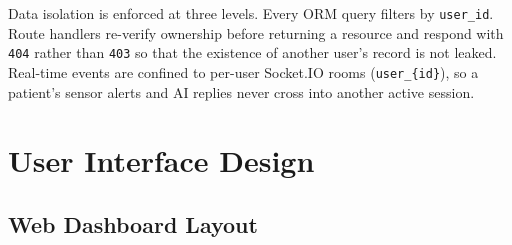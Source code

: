 Data isolation is enforced at three levels. Every ORM query filters by \texttt{user\_id}. Route handlers re-verify ownership before returning a resource and respond with \texttt{404} rather than \texttt{403} so that the existence of another user's record is not leaked. Real-time events are confined to per-user Socket.IO rooms (\texttt{user\_\{id\}}), so a patient's sensor alerts and AI replies never cross into another active session.

\clearpage

\section{User Interface Design}
\label{sec:ui_method}

\subsection{Web Dashboard Layout}

